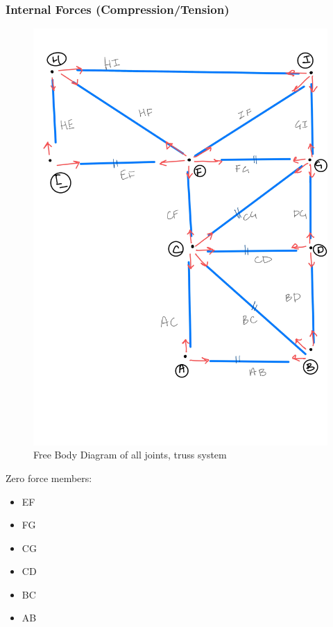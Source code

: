 \subsubsection{Internal Forces (Compression/Tension)}
\begin{figure}
\centering
\includegraphics[width=\textwidth]{con1_fbd.jpg}
\caption{Free Body Diagram of all joints, truss system}
\end{figure}
Zero force members:
\begin{itemize}
\item EF
\item FG
\item CG
\item CD
\item BC
\item AB
\end{itemize}
\centering

